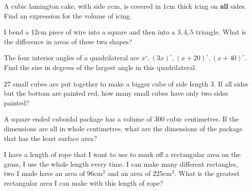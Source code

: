 \documentclass{article}
\theoremstyle{mytheoremstyle}
\theoremstyle{mytheoremstyle}
\theoremstyle{myproblemstyle}
\begin{document}
    \begin{problem}
        A cubic lamington cake, with side $x$cm, is covered in $1$cm thick icing on \textbf{all} sides. Find an expression for the volume of icing.
    \end{problem}

    \begin{problem}
        I bend a 12cm piece of wire into a square and then into a $3, 4, 5$ triangle. What is the difference in areas of these two shapes?
    \end{problem}

    \begin{problem}
        The four interior angles of a quadrilateral are $x^{\circ}, (3x)^{\circ}, (x+20)^{\circ}, (x+40)^{\circ}$. Find the size in degrees of the largest angle in this quadrilateral.
    \end{problem}

    \begin{problem}
        $27$ small cubes are put together to make a bigger cube of side length $3$. If all sides but the bottom are painted red, how many small cubes have only two sides painted?
    \end{problem}

    \begin{problem}
        A square ended cuboidal package has a volume of $300$ cubic centimetres. If the dimensions are all in whole centimetres, what are the dimensions of the package that has the least surface area?
    \end{problem}

    \begin{problem}
        I have a length of rope that I want to use to mark off a rectangular area on the grass, I use the whole length every time. I can make many different rectangles, two I made have an area of $96$cm$^2$ and an area of $225$cm$^2$. What is the greatest rectangular area I can make with this length of rope?
    \end{problem}


    
\end{document}
